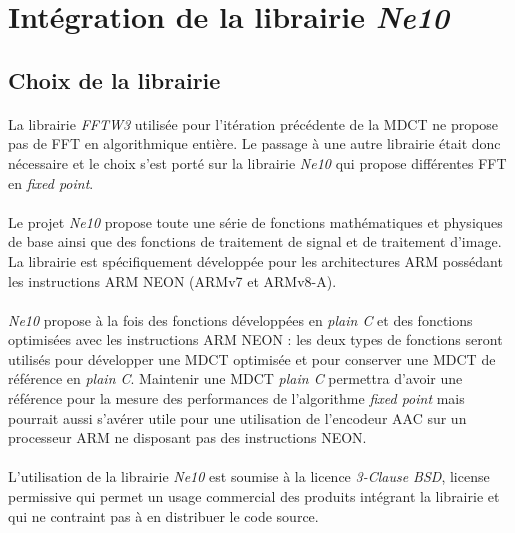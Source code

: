 \documentclass{article}
\begin{document}
    \newpage
    \section{Intégration de la librairie \emph{Ne10}}
    \subsection{Choix de la librairie}
    \paragraph{}
    La librairie \emph{FFTW3} utilisée pour l'itération précédente de la MDCT ne propose pas de FFT en algorithmique entière. Le passage à une autre librairie était donc nécessaire et le choix s'est porté sur la librairie \emph{Ne10} qui propose différentes FFT en \emph{fixed point}.

    \paragraph{}
    Le projet \emph{Ne10} propose toute une série de fonctions mathématiques et physiques de base ainsi que des fonctions de traitement de signal et de traitement d'image. La librairie est spécifiquement développée pour les architectures ARM possédant les instructions ARM NEON (ARMv7 et ARMv8-A)\cite{Ne10}.

    \paragraph{}
    \emph{Ne10} propose à la fois des fonctions développées en \emph{plain C} et des fonctions optimisées avec les instructions ARM NEON : les deux types de fonctions seront utilisés pour développer une MDCT optimisée et pour conserver une MDCT de référence en \emph{plain C}. Maintenir une MDCT \emph{plain C} permettra d'avoir une référence pour la mesure des performances de l'algorithme \emph{fixed point} mais pourrait aussi s'avérer utile pour une utilisation de l'encodeur AAC sur un processeur ARM ne disposant pas des instructions NEON.

    \paragraph{}
    L'utilisation de la librairie \emph{Ne10} est soumise à la licence \emph{3-Clause BSD}, license permissive qui permet un usage commercial des produits intégrant la librairie et qui ne contraint pas à en distribuer le code source\cite{BSD}.
\end{document}
